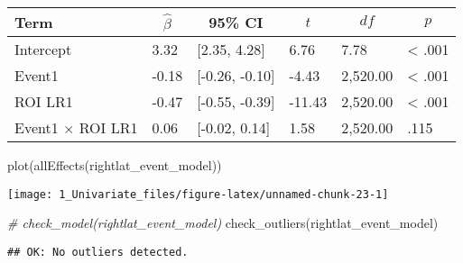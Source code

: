 \documentclass[
]{article}
\newenvironment{Shaded}{\begin{snugshade}}{\end{snugshade}}
\newcommand{\CommentTok}[1]{\textcolor[rgb]{0.56,0.35,0.01}{\textit{#1}}}
\newcommand{\FunctionTok}[1]{\textcolor[rgb]{0.00,0.00,0.00}{#1}}
\newcommand{\NormalTok}[1]{#1}
\newcommand{\SpecialCharTok}[1]{\textcolor[rgb]{0.00,0.00,0.00}{#1}}
\begin{document}
\begin{table}[tbp]

\begin{center}
\begin{threeparttable}

\caption{\label{tab:unnamed-chunk-23}}

\begin{tabular}{llllll}
\toprule
Term & \multicolumn{1}{c}{$\hat{\beta}$} & \multicolumn{1}{c}{95\% CI} & \multicolumn{1}{c}{$t$} & \multicolumn{1}{c}{$\mathit{df}$} & \multicolumn{1}{c}{$p$}\\
\midrule
Intercept & 3.32 & {}[2.35, 4.28] & 6.76 & 7.78 & < .001\\
Event1 & -0.18 & {}[-0.26, -0.10] & -4.43 & 2,520.00 & < .001\\
ROI LR1 & -0.47 & {}[-0.55, -0.39] & -11.43 & 2,520.00 & < .001\\
Event1 $\times$ ROI LR1 & 0.06 & {}[-0.02, 0.14] & 1.58 & 2,520.00 & .115\\
\bottomrule
\end{tabular}

\end{threeparttable}
\end{center}

\end{table}

\begin{Shaded}
\begin{Highlighting}[]
\FunctionTok{plot}\NormalTok{(}\FunctionTok{allEffects}\NormalTok{(rightlat\_event\_model))}
\end{Highlighting}
\end{Shaded}

\texttt{[image: 1\_Univariate\_files/figure-latex/unnamed-chunk-23-1]}

\begin{Shaded}
\begin{Highlighting}[]
\CommentTok{\# check\_model(rightlat\_event\_model)}
\FunctionTok{check\_outliers}\NormalTok{(rightlat\_event\_model)}
\end{Highlighting}
\end{Shaded}

\begin{verbatim}
## OK: No outliers detected.
\end{verbatim}

\begin{Shaded}
\end{Shaded}
\end{document}
